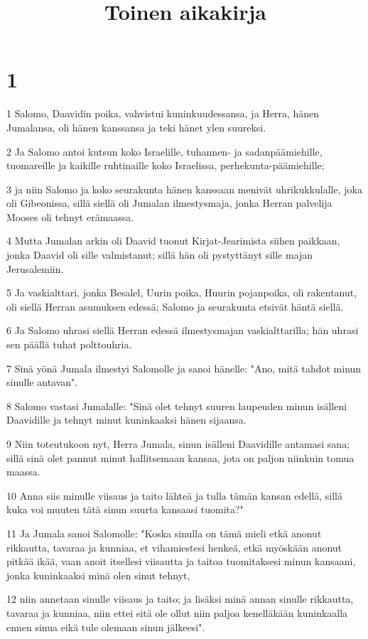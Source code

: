 

\title{Toinen aikakirja}


\chapter{1}

\par 1 Salomo, Daavidin poika, vahvistui kuninkuudessansa, ja Herra, hänen Jumalansa, oli hänen kanssansa ja teki hänet ylen suureksi.
\par 2 Ja Salomo antoi kutsun koko Israelille, tuhannen- ja sadanpäämiehille, tuomareille ja kaikille ruhtinaille koko Israelissa, perhekunta-päämiehille;
\par 3 ja niin Salomo ja koko seurakunta hänen kanssaan menivät uhrikukkulalle, joka oli Gibeonissa, sillä siellä oli Jumalan ilmestysmaja, jonka Herran palvelija Mooses oli tehnyt erämaassa.
\par 4 Mutta Jumalan arkin oli Daavid tuonut Kirjat-Jearimista siihen paikkaan, jonka Daavid oli sille valmistanut; sillä hän oli pystyttänyt sille majan Jerusalemiin.
\par 5 Ja vaskialttari, jonka Besalel, Uurin poika, Huurin pojanpoika, oli rakentanut, oli siellä Herran asumuksen edessä; Salomo ja seurakunta etsivät häntä siellä.
\par 6 Ja Salomo uhrasi siellä Herran edessä ilmestysmajan vaskialttarilla; hän uhrasi sen päällä tuhat polttouhria.
\par 7 Sinä yönä Jumala ilmestyi Salomolle ja sanoi hänelle: "Ano, mitä tahdot minun sinulle antavan".
\par 8 Salomo vastasi Jumalalle: "Sinä olet tehnyt suuren laupeuden minun isälleni Daavidille ja tehnyt minut kuninkaaksi hänen sijaansa.
\par 9 Niin toteutukoon nyt, Herra Jumala, sinun isälleni Daavidille antamasi sana; sillä sinä olet pannut minut hallitsemaan kansaa, jota on paljon niinkuin tomua maassa.
\par 10 Anna siis minulle viisaus ja taito lähteä ja tulla tämän kansan edellä, sillä kuka voi muuten tätä sinun suurta kansaasi tuomita?"
\par 11 Ja Jumala sanoi Salomolle: "Koska sinulla on tämä mieli etkä anonut rikkautta, tavaraa ja kunniaa, et vihamiestesi henkeä, etkä myöskään anonut pitkää ikää, vaan anoit itsellesi viisautta ja taitoa tuomitaksesi minun kansaani, jonka kuninkaaksi minä olen sinut tehnyt,
\par 12 niin annetaan sinulle viisaus ja taito; ja lisäksi minä annan sinulle rikkautta, tavaraa ja kunniaa, niin ettei sitä ole ollut niin paljoa kenelläkään kuninkaalla ennen sinua eikä tule olemaan sinun jälkeesi".
